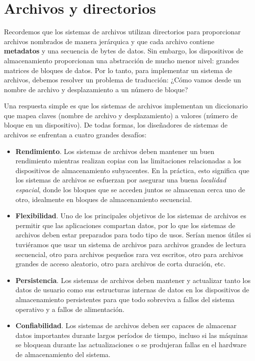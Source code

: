 \documentclass[10pt]{book}
\begin{document}
\setcounter{chapter}{12}
\chapter{Archivos y directorios}
Recordemos que los sistemas de archivos utilizan directorios para proporcionar archivos nombrados de manera jerárquica y que cada archivo contiene \textbf{metadatos} y una secuencia de bytes de datos. Sin embargo, los dispositivos de almacenamiento proporcionan una abstracción de mucho menor nivel: grandes matrices de bloques de datos. Por lo tanto, para implementar un sistema de archivos, debemos resolver un problema de traducción: ¿Cómo vamos desde un nombre de archivo y desplazamiento a un número de bloque?

Una respuesta simple es que los sistemas de archivos implementan un diccionario que mapea claves (nombre de archivo y desplazamiento) a valores (número de bloque en un dispositivo). De todas formas, los diseñadores de sistemas de archivos se enfrentan a cuatro grandes desafíos:
\begin{itemize}
\item \textbf{Rendimiento}. Los sistemas de archivos deben mantener un buen rendimiento mientras realizan copias con las limitaciones relacionadas a los dispositivos de almacenamiento subyacentes. En la práctica, esto significa que los sistemas de archivos se esfuerzan por asegurar una buena \textit{localidad espacial}, donde los bloques que se acceden juntos se almacenan cerca uno de otro, idealmente en bloques de almacenamiento secuencial.
\item \textbf{Flexibilidad}. Uno de los principales objetivos de los sistemas de archivos es permitir que las aplicaciones compartan datos, por lo que los sistemas de archivos deben estar preparados para todo tipo de usos. Serían menos útiles si tuviéramos que usar un sistema de archivos para archivos grandes de lectura secuencial, otro para archivos pequeños rara vez escritos, otro para archivos grandes de acceso aleatorio, otro para archivos de corta duración, etc.
\item \textbf{Persistencia}. Los sistemas de archivos deben mantener y actualizar tanto los datos de usuario como sus estructuras internas de datos en los dispositivos de almacenamiento persistentes para que todo sobreviva a fallos del sistema operativo y a fallos de alimentación.
\item \textbf{Confiabilidad}. Los sistemas de archivos deben ser capaces de almacenar datos importantes durante largos períodos de tiempo, incluso si las máquinas se bloquean durante las actualizaciones o se produjeran fallas en el hardware de almacenamiento del sistema.
\end{itemize}
\end{document}
